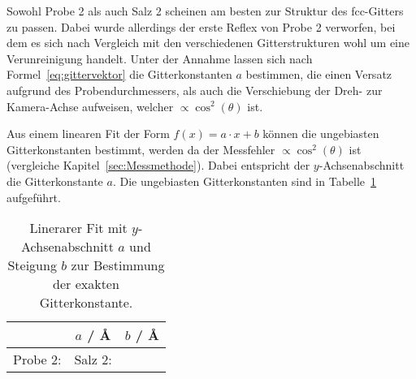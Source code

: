 Sowohl Probe 2 als auch Salz 2 scheinen am besten zur Struktur des fcc-Gitters zu
passen.
Dabei wurde allerdings der erste Reflex von Probe 2 verworfen, bei dem es sich
nach Vergleich mit den verschiedenen Gitterstrukturen wohl um eine Verunreinigung
handelt.
Unter der Annahme lassen sich nach Formel~\eqref{eq:gittervektor} die
Gitterkonstanten $a$ bestimmen, die einen Versatz aufgrund des
Probendurchmessers, als auch die Verschiebung der Dreh- zur Kamera-Achse
aufweisen, welcher $\propto \cos^2(\theta)$ ist.

Aus einem linearen Fit der Form $f(x) = a \cdot x + b$ können die ungebiasten
Gitterkonstanten bestimmt, werden da der Messfehler $\propto \cos^2(\theta)$ ist
(vergleiche Kapitel~\ref{sec:Messmethode}).
Dabei entspricht der $y$-Achsenabschnitt die Gitterkonstante $a$.
Die ungebiasten Gitterkonstanten sind in Tabelle~\ref{tab:gitt} aufgeführt.

\begin{table}[ht]
		\centering
		\caption{Linerarer Fit mit $y$-Achsenabschnitt $a$ und Steigung $b$ zur
				Bestimmung der exakten Gitterkonstante.}
		\label{tab:gitt}
		\begin{tabular}{l c c}
				\toprule
        & $a$ / \AA & $b$ / \AA \\
				\midrule
				Probe 2: 	& 
				Salz 2: 	& 
				\bottomrule
		\end{tabular}
\end{table}
